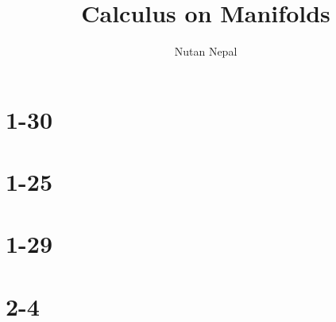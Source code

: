 


\title{Calculus on Manifolds}
\author{Nutan Nepal}



\maketitle

\section{1-30}

\textbf{}
\section{1-25}


\section{1-29}


\section{2-4}


\section{}


